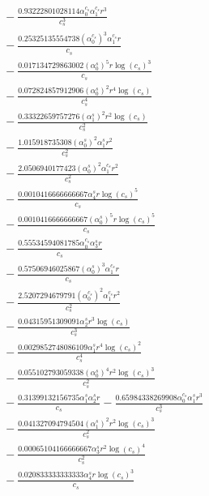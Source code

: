 \documentclass[10pt]{article}
\begin{document}
\begin{align*}
&{}  - \frac{0.93222801028114 \alpha_{0}^{c_s} \alpha_{1}^{c_s} r^{3}}{c_{s}^{3}} \\
&{}  - \frac{0.25325135554738 \left(\alpha_{0}^{c_s}\right)^{3} \alpha_{1}^{c_s} r}{c_{s}} \\
&{}  - \frac{0.017134729863002 \left(\alpha_{0}^s\right)^{5} r \log{\left(c_{s} \right)}^{3}}{c_{s}} \\
&{}  - \frac{0.072824857912906 \left(\alpha_{0}^s\right)^{2} r^{4} \log{\left(c_{s} \right)}}{c_{s}^{4}} \\
&{}  - \frac{0.33322659757276 \left(\alpha_{1}^s\right)^{2} r^{2} \log{\left(c_{s} \right)}}{c_{s}^{2}} \\
&{}  - \frac{1.015918735308 \left(\alpha_{0}^s\right)^{2} \alpha_{1}^s r^{2}}{c_{s}^{2}} \\
&{}  - \frac{2.0506940177423 \left(\alpha_{0}^s\right)^{2} \alpha_{1}^{c_s} r^{2}}{c_{s}^{2}} \\
&{}  - \frac{0.0010416666666667 \alpha_{4}^s r \log{\left(c_{s} \right)}^{5}}{c_{s}} \\
&{}  - \frac{0.0010416666666667 \left(\alpha_{0}^s\right)^{5} r \log{\left(c_{s} \right)}^{5}}{c_{s}} \\
&{}  - \frac{0.55534594081785 \alpha_{0}^{c_s} \alpha_{3}^s r}{c_{s}} \\
&{}  - \frac{0.57506946025867 \left(\alpha_{0}^s\right)^{3} \alpha_{1}^{c_s} r}{c_{s}} \\
&{}  - \frac{2.5207294679791 \left(\alpha_{0}^{c_s}\right)^{2} \alpha_{1}^{c_s} r^{2}}{c_{s}^{2}} \\
&{}  - \frac{0.04315951309091 \alpha_{2}^s r^{3} \log{\left(c_{s} \right)}}{c_{s}^{3}} \\
&{}  - \frac{0.0029852748086109 \alpha_{1}^s r^{4} \log{\left(c_{s} \right)}^{2}}{c_{s}^{4}} \\
&{}  - \frac{0.055102793059338 \left(\alpha_{0}^s\right)^{4} r^{2} \log{\left(c_{s} \right)}^{3}}{c_{s}^{2}} \\
&{}  - \frac{0.31399132156735 \alpha_{1}^s \alpha_{2}^s r}{c_{s}} - \frac{0.65984338269908 \alpha_{0}^{c_s} \alpha_{1}^s r^{3}}{c_{s}^{3}} \\
&{}  - \frac{0.041327094794504 \left(\alpha_{1}^s\right)^{2} r^{2} \log{\left(c_{s} \right)}^{3}}{c_{s}^{2}} \\
&{}  - \frac{0.00065104166666667 \alpha_{3}^s r^{2} \log{\left(c_{s} \right)}^{4}}{c_{s}^{2}} \\
&{}  - \frac{0.020833333333333 \alpha_{4}^s r \log{\left(c_{s} \right)}^{3}}{c_{s}} \\

\end{align*}
\end{document}
